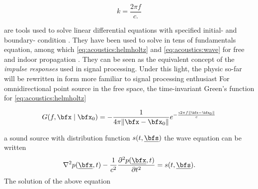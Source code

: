\begin{equation}
    k = \frac{2 \pi f}{c
    .}
\end{equation}

 are tools used to solve linear differential equations with specified
initial- and boundary- condition \cite{Duffy2015}.
They have been used to solve in tens of fundamentals equation,
among which \cref{eq:acoustics:helmholtz} and \cref{eq:acoustics:wave}
for free and indoor propagation
.
They can be seen as the equivalent concept of the \textit{impulse responses} used in signal processing.
Under this light, the physic so-far will be rewritten in form more familiar to signal processing enthusiast
For omnidirectional point source in the free space, the time-invariant Green's function for \cref{eq:acoustics:helmholtz}

\begin{equation}
    G(f, \bfx \mid {\bfx}_0) = - \frac{1}{4 \pi \norm{\bfx - {\bfx}_0}} e^{- \frac{\Ii  2 \pi f \norm{\bfx - {\bfx}_0}}{\speedOfSound}}
\end{equation}

 a sound source with distribution function $s(t, \positionSource)$ the wave equation can be written
\begin{equation}
    \label{eq:acoustics:source}
    \knabla^2 \pressure(\positionMicrophone, t) - \frac{1}{\speedOfSound^2} \kpderiv[2]{\pressure(\positionMicrophone, t)}{t} = s(t, \positionSource)
    .
\end{equation}
The solution of the above equation




